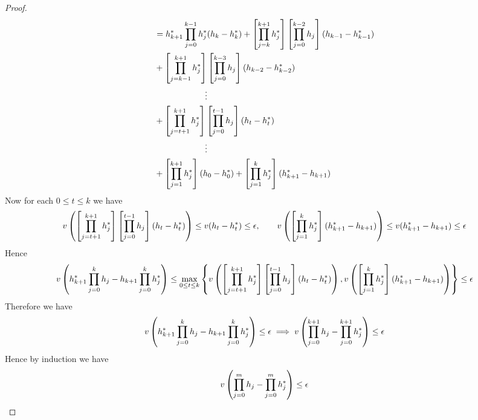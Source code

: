 \begin{proof}
\begin{align*}
		 & = h_{k+1}^*\prod_{j=0}^{k-1}h_j^*(h_{k}-h_k^*)+\left[\prod_{j=k}^{k+1}h_j^*\right]\left[\prod_{j=0}^{k-2}h_j  \right](h_{k-1}-h_{k-1}^*) \\
		 & +\left[\prod_{j=k-1}^{k+1}h_j^*\right]\left[\prod_{j=0}^{k-3}h_j  \right](h_{k-2}-h_{k-2}^*)\\
		 & \qquad\qquad\qquad\vdots\\
		 & +\left[\prod_{j=t+1}^{k+1}h_j^*\right]\left[\prod_{j=0}^{t-1}h_j  \right](h_{t}-h_{t}^*)\\
		  & \qquad\qquad\qquad\vdots\\
		  & + \left[\prod_{j=1}^{k+1}h_j^*\right](h_0-h_0^*)+  \left[\prod_{j=1}^{k}h_j^*\right](h_{k+1}^*-h_{k+1})
	\end{align*}
	Now for each $0\leq t\leq k$ we have $$v\left(  \left[\prod_{j=t+1}^{k+1}h_j^*\right]\left[\prod_{j=0}^{t-1}h_j  \right](h_{t}-h_{t}^*)\right)\leq v(h_t-h_t^*)\leq\epsilon, \qquad v\left(  \left[\prod_{j=1}^{k}h_j^*\right](h_{k+1}^*-h_{k+1})  \right)\leq v(h_{k+1}^*-h_{k+1})\leq \epsilon$$Hence $$v\left( h_{k+1}^*\prod\limits_{j=0}^kh_j-h_{k+1}\prod\limits_{j=0}^{k}h_j^*  \right)\leq \max_{0\leq t\leq k}\left\{  v\left(  \left[\prod_{j=t+1}^{k+1}h_j^*\right]\left[\prod_{j=0}^{t-1}h_j  \right](h_{t}-h_{t}^*)\right),  v\left(  \left[\prod_{j=1}^{k}h_j^*\right](h_{k+1}^*-h_{k+1})  \right)\right\}\leq \epsilon$$Therefore we have  $$ v\left( h_{k+1}^*\prod\limits_{j=0}^kh_j-h_{k+1}\prod\limits_{j=0}^{k}h_j^*  \right)  \leq \epsilon\implies 	v\left(  \prod_{j=0}^{k+1}h_j-\prod_{j=0}^{k+1}h_j^* \right)\leq \epsilon$$Hence by induction we have $$	v\left(  \prod_{j=0}^{m}h_j-\prod_{j=0}^{m}h_j^* \right)\leq \epsilon$$
\end{proof}


